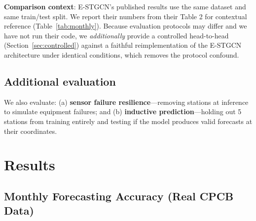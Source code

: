 \documentclass[journal]{IEEEtran}
\begin{document}
\textbf{Comparison context}: E-STGCN's published results \cite{panja2026estgcn} use the same dataset and same train/test split. We report their numbers from their Table 2 for contextual reference (Table~\ref{tab:monthly}). Because evaluation protocols may differ and we have not run their code, we \emph{additionally} provide a controlled head-to-head (Section~\ref{sec:controlled}) against a faithful reimplementation of the E-STGCN architecture under identical conditions, which removes the protocol confound.

\subsection{Additional evaluation}

We also evaluate: (a) \textbf{sensor failure resilience}---removing stations at inference to simulate equipment failures; and (b) \textbf{inductive prediction}---holding out 5 stations from training entirely and testing if the model produces valid forecasts at their coordinates.

\section{Results}
\label{sec:results}

\subsection{Monthly Forecasting Accuracy (Real CPCB Data)}
\end{document}
